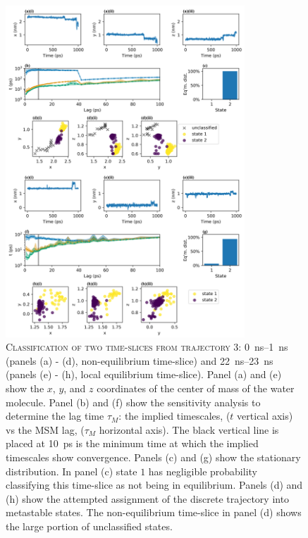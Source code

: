 \begin{figure}[p]
    \centering
    \includegraphics[width=0.8\textwidth]{chapters/water_hopping/figures/Fig_S11.png}
    \caption[Classification of two time-slices from trajectory 3]{\textsc{Classification of two time-slices from trajectory 3}: \SIrange{0}{1}{\nano\second} (panels (a) - (d), non-equilibrium time-slice) and \SIrange{22}{23}{\nano\second} (panels (e) - (h), local equilibrium time-slice). Panel (a) and (e) show the $x$, $y$, and $z$ coordinates of the center of mass of the water molecule. Panel (b) and (f) show the sensitivity analysis to determine the lag time $\tau_{M}$: the implied timescales, ($t$ vertical axis) vs the MSM lag, ($\tau_{M}$ horizontal axis). The black vertical line is placed at \SI{10}{\pico\second} is the minimum time at which the implied timescales show convergence. Panels (c) and (g) show the stationary distribution. In panel (c) state $1$ has negligible probability classifying this time-slice as not being in equilibrium. Panels (d) and (h) show the attempted assignment of the discrete trajectory into metastable states. The non-equilibrium time-slice in panel (d) shows the large portion of unclassified states.}
    \label{fig:wat_s10}
\end{figure}

